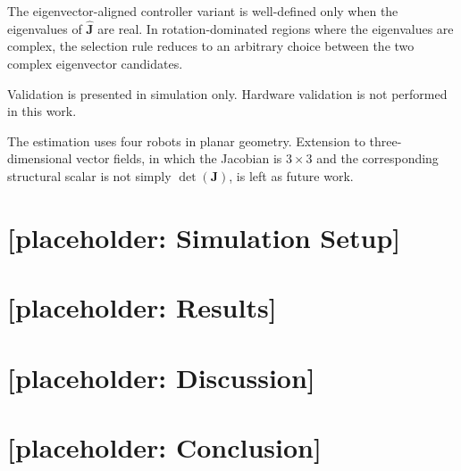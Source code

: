 \documentclass[lettersize,journal]{IEEEtran}
\begin{document}
The eigenvector-aligned controller variant is well-defined only when the eigenvalues of $\hat{\mathbf{J}}$ are real. In rotation-dominated regions where the eigenvalues are complex, the selection rule reduces to an arbitrary choice between the two complex eigenvector candidates.

Validation is presented in simulation only. Hardware validation is not performed in this work.

The estimation uses four robots in planar geometry. Extension to three-dimensional vector fields, in which the Jacobian is $3 \times 3$ and the corresponding structural scalar is not simply $\det(\mathbf{J})$, is left as future work.


\section{[placeholder: Simulation Setup]}

\section{[placeholder: Results]}

\section{[placeholder: Discussion]}

\section{[placeholder: Conclusion]}



\end{document}
